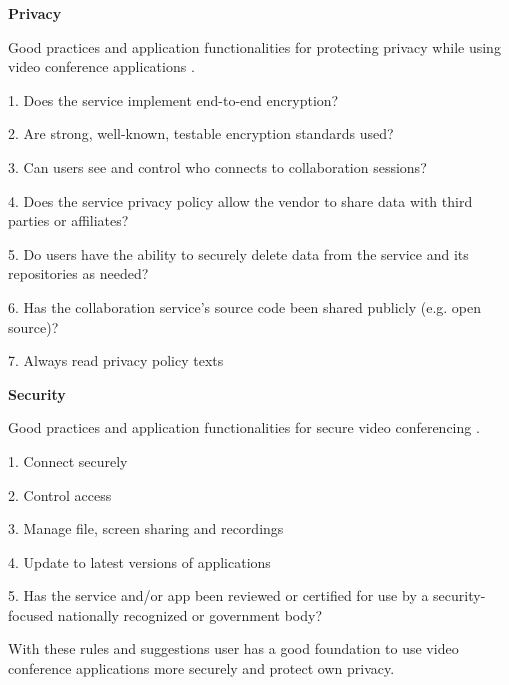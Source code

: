 \documentclass[utf8,english]{gradu3}
\begin{document}
\textbf{Privacy}

Good practices and application functionalities for protecting privacy while using video conference applications \parencite{safetyOfVca}.

1. Does the service implement end-to-end encryption?

2. Are strong, well-known, testable encryption standards used?

3. Can users see and control who connects to collaboration sessions?

4. Does the service privacy policy allow the vendor to share data with third parties or affiliates?

5. Do users have the ability to securely delete data from the service and its repositories as needed?

6. Has the collaboration service's source code been shared publicly (e.g. open source)?

7. Always read privacy policy texts

\textbf{Security}

Good practices and application functionalities for secure video conferencing \parencite{secureVca, safetyOfVca}.

1. Connect securely

2. Control access

3. Manage file, screen sharing and recordings

4. Update to latest versions of applications

5. Has the service and/or app been reviewed or certified for use by a security-focused nationally recognized or government body?

With these rules and suggestions user has a good foundation to use video conference applications more securely and protect own privacy.

%
%
%


\end{document}
